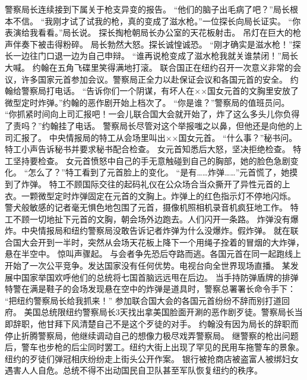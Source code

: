 \documentclass[a4paper,12pt,UTF8,twoside]{ctexbook}
\begin{document}
        警察局长连续接到下属关于枪支异变的报告。  
        “他们的脑子出毛病了吧？”局长根本不信。  
        “我刚才试了试我的枪，真的变成了滋水枪。”一位探长向局长证实。  
        “你表演给我看看。”局长说。  
        探长掏枪朝局长办公室的天花板射击。  
        吊灯在巨大的枪声伴奏下被击得粉碎。  
        局长勃然大怒。探长诚惶诚恐。  
        “刚才确实是滋水枪！”探长一边往门口退一边为自己申辩。  
        “谁再说枪变成了滋水枪我就关谁禁闭！”局长大喊。        
        约翰在五角飞碟里笑得满地打滚。  
        联合国正在纽约召开一次意义非常的会议，许多国家元首参加会议。警察局正全力以赴保证会议和各国元首的安全。  
        约翰给警察局打电话。  
        “告诉你们一个阴谋，有坏人在××国女元首的文胸里安放了微型定时炸弹。”约翰的恶作剧开始上档次了。  
        “你是谁？”警察局的值班员问。  
        “你抓紧时间向上司汇报吧！一会儿联合国大会就开始了，炸了这么多头儿你负得了责吗？”约翰挂了电话。  
        警察局长尽管对这个举报嗤之以鼻，但他还是向他的上司汇报了。  
        中央情报局的特工从会场里叫出××国女元首。  
        “什么事？”秘书问。  
        特工小声告诉秘书并要求秘书配合检查。  
        女元首知悉后大怒，坚决拒绝检查。  
        特工坚持要检查。  
        女元首愤怒中自己的手无意触碰到自己的胸部，她的脸色急剧变化。  
        “怎么了？”特工看到了元首脸上的变化。  
        “是有……炸弹……”元首慌了，她摸到了炸弹。  
        特工不顾国际交往的起码礼仪在公众场合当众撕开了异性元首的上衣。一颗微型定时炸弹固定在元首的文胸上。炸弹上的红色指示灯不停地闪烁。  
        警犬般敏感的记者毫无惧色地包围了元首，摄像机照相机录音机疯狂地工作。  
        特工不顾一切地扯下元首的文胸，朝会场外边跑去。人们闪开一条路。  
        炸弹没有爆炸。中央情报局和纽约警察局没敢告诉记者炸弹为什么没爆炸。假炸弹。  
        就在联合国大会开到一半时，突然从会场天花板上降下一个用绳子拴着的冒烟的大炸弹，悬在半空中。  
        惊叫声骤起。  
        与会者争先恐后夺路而逃。各国元首在同一起跑线上开始了一次公平竞争。发达国家没有任何优势。电视台向全世界现场直播。  
        某发展中国家举国欢呼他们的总统将七国首脑远远甩在后边。  
        当手持防弹盾牌的排弹特警在满是鞋子的会场发现悬在空中的炸弹是道具时，警察总署署长命令手下：  
        “把纽约警察局长给我抓来！”  
        参加联合国大会的各国元首纷纷不辞而别打道回府。  
        美国总统限纽约警察局长3天找出拿美国脸面开涮的恶作剧歹徒。警察局长当即辞职，他甘拜下风清楚自己不是这个歹徒的对手。  
        约翰没有因为局长的辞职而停止折腾警察局，他继续调动自己的想像力极尽戏弄警察局。  
        继警察的枪出问题后，警车也步枪的后尘同时罢工。纽约大街上出现了罕见的民用车拖警车的景象。  
        纽约的歹徒们弹冠相庆纷纷走上街头公开作案。  
        银行被抢商店被盗富人被绑妇女遇害人人自危。总统不得不出动国民自卫队甚至军队恢复纽约的秩序。  
\end{document}
